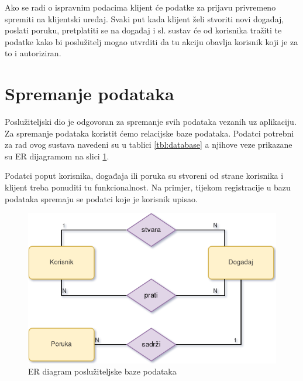 \documentclass[times, utf8, zavrsni]{fer}
\begin{document}
{Ako se radi o ispravnim podacima klijent će podatke za prijavu privremeno spremiti na klijentski uređaj. Svaki put kada klijent želi stvoriti novi događaj, poslati poruku, pretplatiti se na događaj i sl. sustav će od korisnika tražiti te podatke kako bi poslužitelj mogao utvrditi da tu akciju obavlja korisnik koji je za to i autoriziran.

\section{Spremanje podataka}
Poslužiteljski dio je odgovoran za spremanje svih podataka vezanih uz aplikaciju. Za spremanje podataka koristit ćemo relacijske baze podataka. Podatci potrebni za rad ovog sustava navedeni su u tablici \ref{tbl:database} a njihove veze prikazane su ER dijagramom na slici \ref{fig:er-model-image}.

Podatci poput korisnika, događaja ili poruka su stvoreni od strane korisnika i klijent treba ponuditi tu funkcionalnost. Na primjer, tijekom registracije u bazu podataka spremaju se podatci koje je korisnik upisao.

\begin{figure}[htb]
\centering
\includegraphics[width=12cm]{img/er.png}
\caption{ER diagram poslužiteljske baze podataka}
\label{fig:er-model-image}
\end{figure}

}
\end{document}
